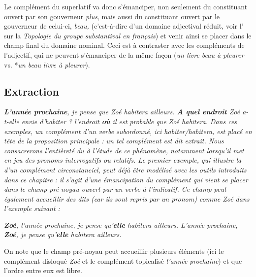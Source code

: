 Le complément du superlatif va donc s’émanciper, non seulement du constituant ouvert par son gouverneur \textit{plus}, mais aussi du constituant ouvert par le gouverneur de celui-ci, \textit{beau,} (c’est-à-dire d’un domaine adjectival réduit, voir l’ sur la \textit{Topologie du groupe substantival en français}) et venir ainsi se placer dans le champ final du domaine nominal. Ceci est à contraster avec les compléments de l’adjectif, qui ne peuvent s’émanciper de la même façon (\textit{un livre beau à pleurer} vs. *\textit{un beau livre à pleurer}).

\subsection{Extraction}
\ea
\ea \itshape \textbf{L’année  prochaine},  je pense que Zoé habitera ailleurs.
\ex \itshape \textbf{A quel endroit}  Zoé a-t-elle envie d’habiter ?
\ex \itshape l’endroit \textbf{où}  il est probable que Zoé habitera.
\z
\z
Dans ces exemples, un complément d’un verbe subordonné, ici \textit{habiter/habitera}, est placé en tête de la proposition principale : un tel complément est dit extrait. Nous consacrerons l’entièreté du  à l’étude de ce phénomène, notamment lorsqu’il met en jeu des pronoms interrogatifs ou relatifs. Le premier exemple, qui illustre la  d’un complément circonstanciel, peut déjà être modélisé avec les outils introduits dans ce chapitre : il s’agit d’une émancipation du complément qui vient se placer dans le champ pré-noyau ouvert par un verbe à l’indicatif. Ce champ peut également accueillir des  dits  (car ils sont repris par un pronom) comme \textit{Zoé} dans l’exemple suivant :

\ea
\ea \itshape \textbf{Zoé},  l’année  prochaine,  je pense qu’\textbf{elle}  habitera ailleurs.
\ex \itshape L’année  prochaine, \textbf{Zoé},  je pense qu’\textbf{elle}  habitera ailleurs.
\z
\z

On note que le champ pré-noyau peut accueillir plusieurs éléments (ici le complément disloqué \textit{Zoé} et le complément topicalisé \textit{l’année} \textit{prochaine}) et que l’ordre entre eux est libre.

